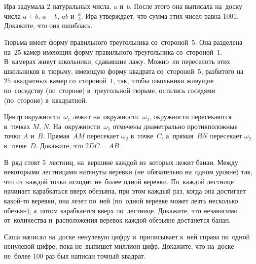 


\begin{problems}

\item
Ира задумала $2$ натуральных числа, $a$ и~$b$.
После этого она выписала на~доску числа $a + b$, $a - b$, $a b$ и~$\frac{a}{b}$.
Ира утверждает, что сумма этих чисел равна 1001.
Докажите, что она ошиблась.

\item
Тюрьма имеет форму правильного треугольника со~стороной~$5$.
Она разделена на~$25$ камер имеющих форму правильного треугольника
со~стороной~$1$.
В~камерах живут школьники, сдававшие лажу.
Можно~ли переселить этих школьников в~тюрьму, имеющую форму квадрата
со~стороной~$5$, разбитого на~$25$ квадратных камер со~стороной~$1$, так, чтобы
школьники живущие по~соседству (по~стороне) в~треугольной тюрьме, остались
соседями (по~стороне) в~квадратной.

\item
Центр окружности~$\omega_{1}$ лежит на~окружности~$\omega_{2}$, окружности
пересекаются в~точках $M$, $N$.
На~окружности~$\omega_{1}$ отмечены диаметрально противположные
точки $A$ и~$B$.
Прямая~$AM$ пересекает $\omega_{2}$ в~точке~$C$, а~прямая~$BN$ пересекает
$\omega_{2}$ в~точке~$D$.
Докажите, что $2 DC = AB$.

\item
В~ряд стоят 5~лестниц, на~вершине каждой из~которых лежит банан.
Между некоторыми лестницами натянуты веревки (не~обязательно на~одном уровне)
так, что из~каждой точки исходит не~более одной веревки.
По~каждой лестнице начинает карабкаться вверх обезьяна, при этом каждый раз,
когда она достигает какой-то веревки, она лезет по~ней (по~одной веревке может
лезть несколько обезьян), а~потом карабкается вверх по~лестнице.
Докажите, что независимо от~количества и~расположения веревок каждой обезьяне
достанется банан.

\item
Саша написал на~доске ненулевую цифру и~приписывает к~ней справа по~одной
ненулевой цифре, пока не~выпишет миллион цифр.
Докажите, что на~доске не~более 100 раз был написан точный квадрат.

\end{problems}

